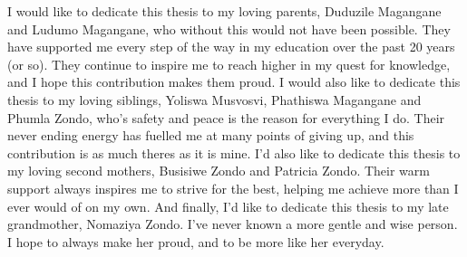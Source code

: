 
\begin{dedication} 

I would like to dedicate this thesis to my loving parents, Duduzile Magangane and Ludumo Magangane, who without this would not have been possible. They have supported me every step of the way in my education over the past 20 years (or so). They continue to inspire me to reach higher in my quest for knowledge, and I hope this contribution makes them proud. \newline
I would also like to dedicate this thesis to my loving siblings, Yoliswa Musvosvi, Phathiswa Magangane and Phumla Zondo, who's safety and peace is the reason for everything I do. Their never ending energy has fuelled me at many points of giving up, and this contribution is as much theres as it is mine. I'd also like to dedicate this thesis to my loving second mothers, Busisiwe Zondo and Patricia Zondo. Their warm support always inspires me to strive for the best, helping me achieve more than I ever would of on my own. And finally, I'd like to dedicate this thesis to my late grandmother, Nomaziya Zondo. I've never known a more gentle and wise person. I hope to always make her proud, and to be more like her everyday. 
 
\end{dedication}